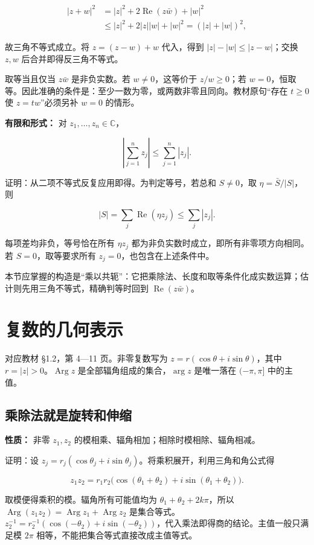 \documentclass[11pt,a4paper]{article}
\begin{document}
\[
\begin{aligned}
|z+w|^2&=|z|^2+2\operatorname{Re}(z\bar w)+|w|^2\\
&\le |z|^2+2|z||w|+|w|^2=(|z|+|w|)^2,
\end{aligned}
\]

故三角不等式成立。将 \(z=(z-w)+w\) 代入，得到 \(|z|-|w|\le|z-w|\)；交换
\(z,w\) 后合并即得反三角不等式。

取等当且仅当 \(z\bar w\) 是非负实数。若 \(w\ne0\)，这等价于
\(z/w\ge0\)；若
\(w=0\)，恒取等。因此准确的条件是：至少一数为零，或两数非零且同向。教材原句``存在
\(t\ge0\) 使 \(z=tw\)''必须另补 \(w=0\) 的情形。

\textbf{有限和形式：} 对 \(z_1,\ldots,z_n\in\mathbb C\)，

\[
\left|\sum_{j=1}^n z_j\right|\le\sum_{j=1}^n|z_j|.
\]

证明：从二项不等式反复应用即得。为判定等号，若总和 \(S\ne0\)，取
\(\eta=\bar S/|S|\)，则

\[
|S|=\sum_j\operatorname{Re}(\eta z_j)\le\sum_j|z_j|.
\]

每项差均非负，等号恰在所有 \(\eta z_j\)
都为非负实数时成立，即所有非零项方向相同。若 \(S=0\)，取等要求所有
\(z_j=0\)，也包含在上述条件中。

本节应掌握的构造是``乘以共轭''：它把乘除法、长度和取等条件化成实数运算；估计则先用三角不等式，精确判等时回到
\(\operatorname{Re}(z\bar w)\)。

\section{复数的几何表示}
对应教材 §1.2，第 4---11 页。非零复数写为
\(z=r(\cos\theta+i\sin\theta)\)，其中
\(r=|z|>0\)。\(\operatorname{Arg}z\) 是全部辐角组成的集合，\(\arg z\)
是唯一落在 \((-\pi,\pi]\) 中的主值。

\subsection{乘除法就是旋转和伸缩}\label{ux4e58ux9664ux6cd5ux5c31ux662fux65cbux8f6cux548cux4f38ux7f29}

\textbf{性质：} 非零 \(z_1,z_2\)
的模相乘、辐角相加；相除时模相除、辐角相减。

证明：设
\(z_j=r_j(\cos\theta_j+i\sin\theta_j)\)。将乘积展开，利用三角和角公式得

\[
z_1z_2=r_1r_2\bigl(\cos(\theta_1+\theta_2)+i\sin(\theta_1+\theta_2)\bigr).
\]

取模便得乘积的模。辐角所有可能值均为 \(\theta_1+\theta_2+2k\pi\)，所以
\(\operatorname{Arg}(z_1z_2)=\operatorname{Arg}z_1+\operatorname{Arg}z_2\)
是集合等式。\(z_2^{-1}=r_2^{-1}(\cos(-\theta_2)+i\sin(-\theta_2))\)，代入乘法即得商的结论。主值一般只满足模
\(2\pi\) 相等，不能把集合等式直接改成主值等式。
\end{document}
